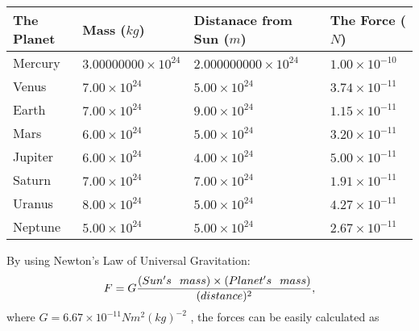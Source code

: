 \documentclass[12pt]{article}
\begin{document}
\vspace{0.2in}
 
 
\begin{tabular}{|l|l|l|l|}
\hline
The Planet & Mass ($kg$) & Distanace from Sun ($m$) & The Force ($N$)\\
\hline
Mercury  &
           $ %
3.00000000 \times 10^{24} $   &
             $ %
2.000000000 \times 10^{24} $    & $ %
1.00 \times 10^{-10} $
\\  \hline
Venus    &
           $  %
7.00 \times 10^{24}  $     &
             $ %
5.00 \times 10^{24} $    & $ %
3.74 \times 10^{-11} $
\\  \hline
Earth    &
           $  %
7.00 \times 10^{24}  $     &
             $ %
9.00 \times 10^{24} $    & $ %
1.15 \times 10^{-11} $
\\   \hline
Mars     &
           $  %
6.00 \times 10^{24} $     &
             $ %
5.00 \times 10^{24} $    & $ %
3.20 \times 10^{-11} $
\\   \hline
Jupiter  &
           $  %
6.00 \times 10^{24} $    &
             $ %
4.00 \times 10^{24} $    & $ %
5.00 \times 10^{-11} $
\\  \hline
Saturn   &
           $  %
7.00 \times 10^{24} $    &
             $ %
7.00 \times 10^{24}  $    & $ %
1.91 \times 10^{-11} $
\\  \hline
Uranus   &
           $  %
8.00 \times 10^{24} $    &
             $ %
5.00 \times 10^{24} $    & $ %
4.27 \times 10^{-11} $
\\  \hline
Neptune  &
           $  %
5.00 \times 10^{24} $    &
             $ %
5.00 \times 10^{24} $    & $ %
2.67 \times 10^{-11} $
\\  \hline
 
\end{tabular}
 
 
 
 
 
 
\noindent{}

By using Newton's Law of Universal Gravitation:
\[
F=G \frac{(Sun's \hspace{0.1in} mass) \times (Planet's \hspace{0.1in} mass)} { (distance)^2},
\]
where
$ G= %
6.67 \times 10^{-11} N m^{2}(kg)^{-2}$ , the forces can be easily calculated as
 
\vspace{0.2in}
 
\end{document}
